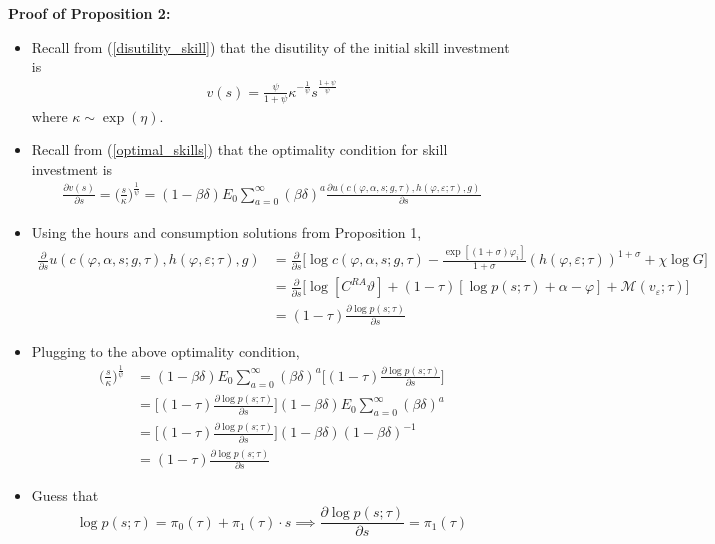 \documentclass{article}
\newcommand{\M}{\mathcal{M}}
\begin{document}
\textbf{Proof of Proposition 2:} 
\begin{itemize}
\item Recall from (\ref{disutility_skill}) that the disutility of the initial skill investment is
\begin{align*}
v(s) = \frac{\psi}{1 + \psi} \kappa^{-\frac{1}{\psi}} s^\frac{1 + \psi}{\psi} 
\end{align*}
where $\kappa \sim \exp(\eta)$.
\item Recall from (\ref{optimal_skills}) that the optimality condition for skill investment is
\begin{align*}
\frac{\partial v(s)}{\partial s} =\Bigg(\frac{s}{\kappa}\Bigg)^{\frac{1}{\psi}} = (1 - \beta \delta) E_0 \sum_{a = 0}^\infty (\beta \delta)^a \frac{\partial u(c(\varphi, \alpha, s;g, \tau), h(\varphi, \varepsilon; \tau), g)}{\partial s}
\end{align*}
\item Using the hours and consumption solutions from Proposition 1,
\begin{align*}
\frac{\partial }{\partial s}  u(c(\varphi, \alpha, s;g, \tau), h(\varphi, \varepsilon; \tau), g)
&= 
\frac{\partial }{\partial s}\Bigg[\log c(\varphi, \alpha, s;g, \tau) - \frac{\exp [(1+\sigma) \varphi_i] }{1 + \sigma} (h(\varphi, \varepsilon; \tau))^{1 + \sigma} + \chi \log G\Bigg] \\
&= 
\frac{\partial }{\partial s} \Bigg[\log [C^{RA}\vartheta] + (1 - \tau) [\log p(s; \tau) + \alpha - \varphi] + \M (v_\varepsilon; \tau)\Bigg]\\
&= (1-\tau) \frac{\partial \log p(s; \tau)}{\partial s}
\end{align*}
\item Plugging to the above optimality condition,
\begin{align*}
\Bigg(\frac{s}{\kappa}\Bigg)^{\frac{1}{\psi}} 
&= (1 - \beta \delta) E_0 \sum_{a = 0}^\infty (\beta \delta)^a  \Bigg[ (1-\tau)\frac{\partial \log p(s; \tau)}{\partial s} \Bigg] \\
&= \Bigg[ (1-\tau)\frac{\partial \log p(s; \tau)}{\partial s} \Bigg](1 - \beta \delta) E_0 \sum_{a = 0}^\infty (\beta \delta)^a   \\
&= \Bigg[ (1-\tau)\frac{\partial \log p(s; \tau)}{\partial s} \Bigg](1 - \beta \delta) (1 - \beta \delta)^{-1}   \\
&= (1-\tau)\frac{\partial \log p(s; \tau)}{\partial s}
\end{align*}
\item Guess that 
$$
\log p(s; \tau) = \pi_0(\tau) + \pi_1(\tau) \cdot s \implies \frac{\partial \log p(s; \tau)}{\partial s} = \pi_1(\tau)  
$$
\end{itemize}
\end{document}
